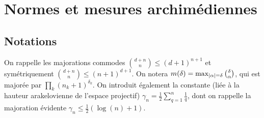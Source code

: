 
\chapter{Normes et mesures archimédiennes}


\section{Notations}

On rappelle les majorations commodes $\binom{d + n}{n} \le (d + 1)^{n+1}$ et
symétriquement $\binom{d + n}{n} \le (n + 1)^{d+1}$. On notera $m(\delta) =
\max_{\lvert\alpha\rvert = \delta} {\textstyle \binom\delta\alpha} $, qui est majorée
par $\prod\nolimits_k (n_k + 1)^{\delta_k}$. On introduit également la
constante (liée à la hauteur arakelovienne de l'espace projectif) $\gamma_n =
\frac12 \sum_{q=1}^{n} \frac1q$, dont on rappelle la majoration évidente
$\gamma_n \le \frac12 (\log(n) + 1)$.


\cleardoublepage
\endinput

